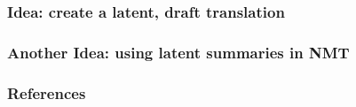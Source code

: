 \documentclass[xetex,aspectratio=169,xcolor,professionalfonts,hyperref]{beamer}
\begin{document}
\begin{frame}
    \frametitle{Idea: create a latent, draft translation}

    \centering

\end{frame}

\begin{frame}
    \frametitle{Another Idea: using latent summaries in NMT}

    \centering

\end{frame}

\begin{frame}[t,allowframebreaks]
\frametitle{References}
\printbibliography
\end{frame}
\end{document}
